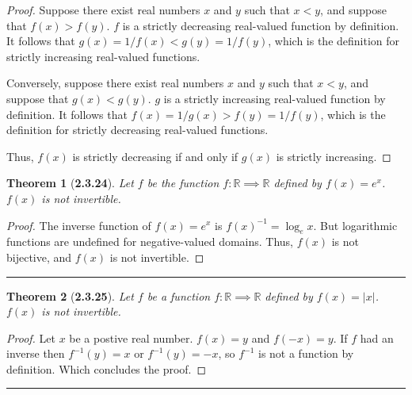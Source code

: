 \documentclass[a4paper, 12pt]{article}
\theoremstyle{plain}
\newtheorem*{theorem*}{Theorem}
\begin{document}
\begin{proof}
    Suppose there exist real numbers $x$ and $y$ such that $x < y$, and suppose that 
    $f(x) > f(y)$. $f$ is a strictly decreasing real-valued function by definition. It follows 
    that $g(x) = 1/f(x) < g(y) = 1/f(y)$, which is the definition for strictly increasing 
    real-valued functions.
    
    Conversely, suppose there exist real numbers $x$ and $y$ such that $x < y$, and suppose that 
    $g(x) < g(y)$. $g$ is a strictly increasing real-valued function by definition. It follows 
    that $f(x) = 1/g(x) > f(y) = 1/f(y)$, which is the definition for strictly decreasing 
    real-valued functions.
    
    Thus, $f(x)$ is strictly decreasing if and only if $g(x)$ is strictly increasing.
\end{proof}

\pagebreak


\begin{theorem*}[\textbf{2.3.24}]
    Let $f$ be the function $f: \mathbb{R} \implies \mathbb{R}$ defined by 
    $f(x) = e^{x}$. $f(x)$ is not invertible.
\end{theorem*}

\begin{proof}
    The inverse function of $f(x) = e^{x}$ is $f(x)^{-1} = \log_{e}x$. But \newline 
    logarithmic functions are undefined for negative-valued domains. Thus, $f(x)$ is not 
    bijective, and $f(x)$ is not invertible.
\end{proof}
\begin{center}
    \rule{5.4in}{1pt}
\end{center}


\begin{theorem*}[\textbf{2.3.25}]
    Let $f$ be a function $f: \mathbb{R} \implies \mathbb{R}$ defined by $f(x) = |x|$. $f(x)$ 
    is not invertible.
\end{theorem*}

\begin{proof}
    Let $x$ be a postive real number. $f(x) = y$ and $f(-x) = y$. If $f$ had an inverse then 
    $f^{-1}(y) = x$ or $f^{-1}(y) = -x$, so $f^{-1}$ is not a function by definition. Which
    concludes the proof.
\end{proof}
\begin{center}
    \rule{5.4in}{1pt}
\end{center}
\end{document}

